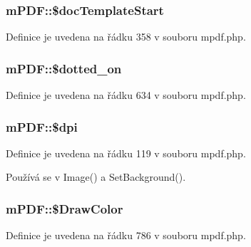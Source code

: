 \hypertarget{classm_p_d_f_adb5017563e94a07a633448b20f98ef9d}{
\subsubsection[{\$doc\-Template\-Start}]{\setlength{\rightskip}{0pt plus 5cm}m\-P\-D\-F\-::\$doc\-Template\-Start}}\label{classm_p_d_f_adb5017563e94a07a633448b20f98ef9d}


Definice je uvedena na řádku 358 v souboru mpdf.\-php.

\hypertarget{classm_p_d_f_ad777109a28d0849c48c101ff01d83a6e}{
\subsubsection[{\$dotted\-\_\-on}]{\setlength{\rightskip}{0pt plus 5cm}m\-P\-D\-F\-::\$dotted\-\_\-on}}\label{classm_p_d_f_ad777109a28d0849c48c101ff01d83a6e}


Definice je uvedena na řádku 634 v souboru mpdf.\-php.

\hypertarget{classm_p_d_f_a70e59e1b09972f04567c345b00a42342}{
\subsubsection[{\$dpi}]{\setlength{\rightskip}{0pt plus 5cm}m\-P\-D\-F\-::\$dpi}}\label{classm_p_d_f_a70e59e1b09972f04567c345b00a42342}


Definice je uvedena na řádku 119 v souboru mpdf.\-php.



Používá se v Image() a Set\-Background().

\hypertarget{classm_p_d_f_a9b19d09d28bf66f2f8222c40a096d1ea}{
\subsubsection[{\$\-Draw\-Color}]{\setlength{\rightskip}{0pt plus 5cm}m\-P\-D\-F\-::\$\-Draw\-Color}}\label{classm_p_d_f_a9b19d09d28bf66f2f8222c40a096d1ea}


Definice je uvedena na řádku 786 v souboru mpdf.\-php.



